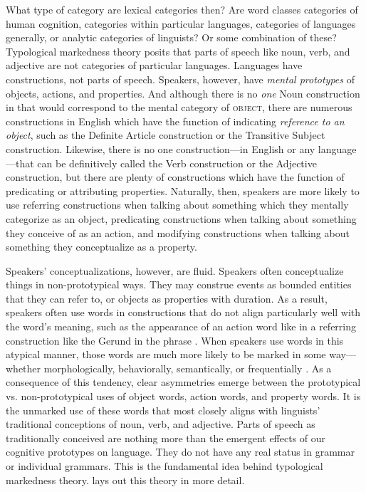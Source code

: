 What type of category are lexical categories then? Are word classes categories of human cognition, categories within particular languages, categories of languages generally, or analytic categories of linguists? Or some combination of these? Typological markedness theory posits that parts of speech like noun, verb, and adjective are not categories of particular languages. Languages have constructions, not parts of speech. Speakers, however, have \emph{mental prototypes} of objects, actions, and properties. And although there is no \emph{one} Noun construction in  that would correspond to the mental category of \textsc{object}, there are numerous constructions in English which have the function of indicating \emph{reference to an object}, such as the Definite Article construction or the Transitive Subject construction. Likewise, there is no one construction—in English or any language—that can be definitively called the Verb construction or the Adjective construction, but there are plenty of constructions which have the function of predicating or attributing properties. Naturally, then, speakers are more likely to use referring constructions when talking about something which they mentally categorize as an object, predicating constructions when talking about something they conceive of as an action, and modifying constructions when talking about something they conceptualize as a property.

Speakers' conceptualizations, however, are fluid. Speakers often conceptualize things in non-prototypical ways. They may construe events as bounded entities that they can refer to, or objects as properties with duration. As a result, speakers often use words in constructions that do not align particularly well with the word's meaning, such as the appearance of an action word like  in a referring construction like the Gerund in the phrase . When speakers use words in this atypical manner, those words are much more likely to be marked in some way—whether morphologically, behaviorally, semantically, or frequentially \parencite[§2.2]{Croft1991}. As a consequence of this tendency, clear asymmetries emerge between the prototypical vs. non-prototypical uses of object words, action words, and property words. It is the unmarked use of these words that most closely aligns with linguists' traditional conceptions of noun, verb, and adjective. Parts of speech as traditionally conceived are nothing more than the emergent effects of our cognitive prototypes on language. They do not have any real status in grammar or individual grammars. This is the fundamental idea behind typological markedness theory.  lays out this theory in more detail.

